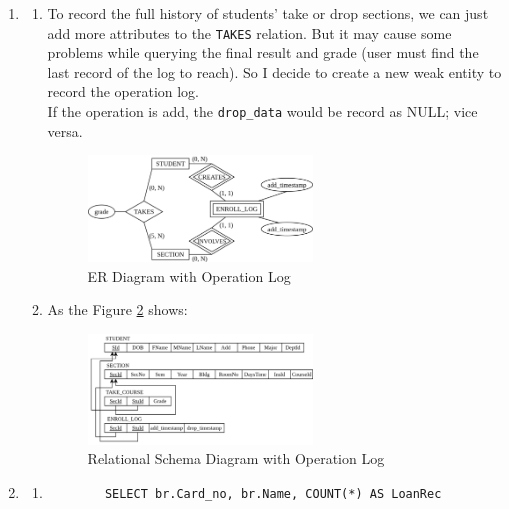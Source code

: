 \documentclass[12pt,a4paper]{article}
\begin{document}
\begin{enumerate}
\begin{enumerate}
    \end{enumerate}
    \item \begin{enumerate}
        \item To record the full history of students' take or drop sections, we can just add more attributes to the \texttt{TAKES} relation. But it may cause some problems while querying the final result and grade (user must find the last record of the log to reach). So I decide to create a new weak entity to record the operation log.\\
        If the operation is add, the \texttt{drop\_data} would be record as NULL; vice versa.\\
        \begin{figure}[H]
            \centering
            \includegraphics[width=0.6\textwidth]{src/2A.png}
            \caption{ER Diagram with Operation Log}
            \label{fig:ER_diagram_with_log}
        \end{figure}
        \item As the Figure \ref{fig:ER_diagram_with_advisor} shows:
        \begin{figure}[H]
            \centering
            \includegraphics[width=0.6\textwidth]{src/2B.png}
            \caption{Relational Schema Diagram with Operation Log}
            \label{fig:ER_diagram_with_advisor}
        \end{figure}
    \end{enumerate}
    \item 
    \begin{enumerate}
        \item
        \begin{verbatim}
        SELECT br.Card_no, br.Name, COUNT(*) AS LoanRec

\end{verbatim}
\end{enumerate}
\end{enumerate}
\end{document}
